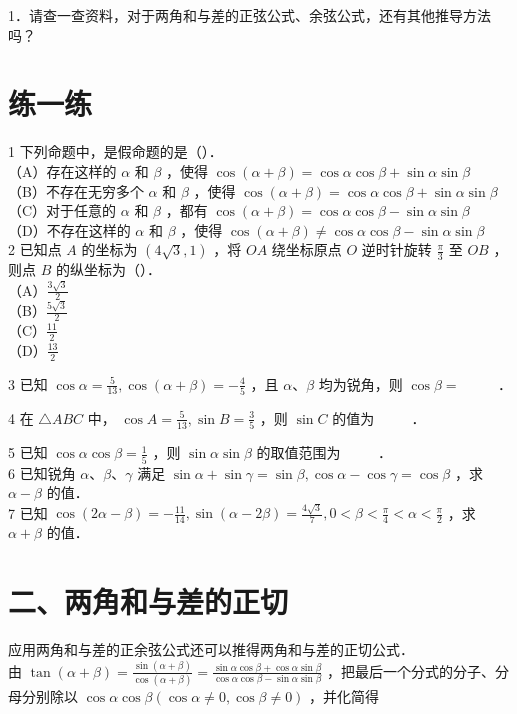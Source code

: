 \documentclass[10pt]{article}
\begin{document}
1．请查一查资料，对于两角和与差的正弦公式、余弦公式，还有其他推导方法吗？

\section*{练一练}
1 下列命题中，是假命题的是（）．\\
（A）存在这样的 \(\alpha\) 和 \(\beta\) ，使得 \(\cos (\alpha+\beta)=\cos \alpha \cos \beta+\sin \alpha \sin \beta\)\\
（B）不存在无穷多个 \(\alpha\) 和 \(\beta\) ，使得 \(\cos (\alpha+\beta)=\cos \alpha \cos \beta+\sin \alpha \sin \beta\)\\
（C）对于任意的 \(\alpha\) 和 \(\beta\) ，都有 \(\cos (\alpha+\beta)=\cos \alpha \cos \beta-\sin \alpha \sin \beta\)\\
（D）不存在这样的 \(\alpha\) 和 \(\beta\) ，使得 \(\cos (\alpha+\beta) \neq \cos \alpha \cos \beta-\sin \alpha \sin \beta\)\\
2 已知点 \(A\) 的坐标为 \((4 \sqrt{3}, 1)\) ，将 \(O A\) 绕坐标原点 \(O\) 逆时针旋转 \(\frac{\pi}{3}\) 至 \(O B\) ，则点 \(B\) 的纵坐标为（）．\\
（A）\(\frac{3 \sqrt{3}}{2}\)\\
（B）\(\frac{5 \sqrt{3}}{2}\)\\
（C）\(\frac{11}{2}\)\\
（D）\(\frac{13}{2}\)

3 已知 \(\cos \alpha=\frac{5}{13}, \cos (\alpha+\beta)=-\frac{4}{5}\) ，且 \(\alpha 、 \beta\) 均为锐角，则 \(\cos \beta=\) \(\qquad\) ．

4 在 \(\triangle A B C\) 中， \(\cos A=\frac{5}{13}, \sin B=\frac{3}{5}\) ，则 \(\sin C\) 的值为 \(\qquad\) ．

5 已知 \(\cos \alpha \cos \beta=\frac{1}{5}\) ，则 \(\sin \alpha \sin \beta\) 的取值范围为 \(\qquad\) ．\\
6 已知锐角 \(\alpha 、 \beta 、 \gamma\) 满足 \(\sin \alpha+\sin \gamma=\sin \beta, \cos \alpha-\cos \gamma=\cos \beta\) ，求 \(\alpha-\beta\) 的值．\\
7 已知 \(\cos (2 \alpha-\beta)=-\frac{11}{14}, \sin (\alpha-2 \beta)=\frac{4 \sqrt{3}}{7}, 0<\beta<\frac{\pi}{4}<\alpha<\frac{\pi}{2}\) ，求 \(\alpha+\beta\) 的值．

\section*{二、两角和与差的正切}
应用两角和与差的正余弦公式还可以推得两角和与差的正切公式．\\
由 \(\tan (\alpha+\beta)=\frac{\sin (\alpha+\beta)}{\cos (\alpha+\beta)}=\frac{\sin \alpha \cos \beta+\cos \alpha \sin \beta}{\cos \alpha \cos \beta-\sin \alpha \sin \beta}\) ，把最后一个分式的分子、分母分别除以 \(\cos \alpha \cos \beta(\cos \alpha \neq 0, \cos \beta \neq 0)\) ，并化简得
\end{document}
